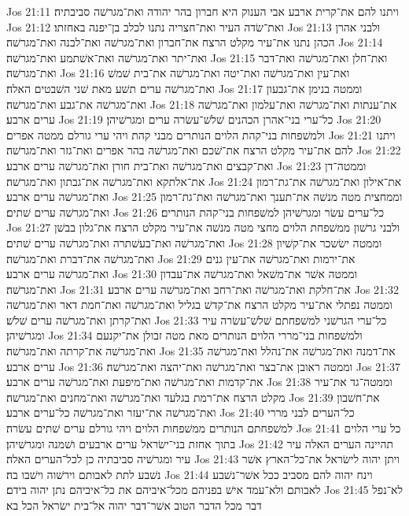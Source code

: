 Jos 21:11  ויתנו להם את־קרית ארבע אבי הענוק היא חברון בהר יהודה ואת־מגרשׁה סביבתיה׃
Jos 21:12  ואת־שׂדה העיר ואת־חצריה נתנו לכלב בן־יפנה באחזתו׃
Jos 21:13  ולבני אהרן הכהן נתנו את־עיר מקלט הרצח את־חברון ואת־מגרשׁה ואת־לבנה ואת־מגרשׁה׃
Jos 21:14  ואת־יתר ואת־מגרשׁה ואת־אשׁתמע ואת־מגרשׁה׃
Jos 21:15  ואת־חלן ואת־מגרשׁה ואת־דבר ואת־מגרשׁה׃
Jos 21:16  ואת־עין ואת־מגרשׁה ואת־יטה ואת־מגרשׁה את־בית שׁמשׁ ואת־מגרשׁה ערים תשׁע מאת שׁני השׁבטים האלה׃
Jos 21:17  וממטה בנימן את־גבעון ואת־מגרשׁה את־גבע ואת־מגרשׁה׃
Jos 21:18  את־ענתות ואת־מגרשׁה ואת־עלמון ואת־מגרשׁה ערים ארבע׃
Jos 21:19  כל־ערי בני־אהרן הכהנים שׁלשׁ־עשׂרה ערים ומגרשׁיהן׃
Jos 21:20  ולמשׁפחות בני־קהת הלוים הנותרים מבני קהת ויהי ערי גורלם ממטה אפרים׃
Jos 21:21  ויתנו להם את־עיר מקלט הרצח את־שׁכם ואת־מגרשׁה בהר אפרים ואת־גזר ואת־מגרשׁה׃
Jos 21:22  ואת־קבצים ואת־מגרשׁה ואת־בית חורן ואת־מגרשׁה ערים ארבע׃
Jos 21:23  וממטה־דן את־אלתקא ואת־מגרשׁה את־גבתון ואת־מגרשׁה׃
Jos 21:24  את־אילון ואת־מגרשׁה את־גת־רמון ואת־מגרשׁה ערים ארבע׃
Jos 21:25  וממחצית מטה מנשׁה את־תענך ואת־מגרשׁה ואת־גת־רמון ואת־מגרשׁה ערים שׁתים׃
Jos 21:26  כל־ערים עשׂר ומגרשׁיהן למשׁפחות בני־קהת הנותרים׃
Jos 21:27  ולבני גרשׁון ממשׁפחת הלוים מחצי מטה מנשׁה את־עיר מקלט הרצח את־גלון בבשׁן ואת־מגרשׁה ואת־בעשׁתרה ואת־מגרשׁה ערים שׁתים׃
Jos 21:28  וממטה ישׂשכר את־קשׁיון ואת־מגרשׁה את־דברת ואת־מגרשׁה׃
Jos 21:29  את־ירמות ואת־מגרשׁה את־עין גנים ואת־מגרשׁה ערים ארבע׃
Jos 21:30  וממטה אשׁר את־משׁאל ואת־מגרשׁה את־עבדון ואת־מגרשׁה׃
Jos 21:31  את־חלקת ואת־מגרשׁה ואת־רחב ואת־מגרשׁה ערים ארבע׃
Jos 21:32  וממטה נפתלי את־עיר מקלט הרצח את־קדשׁ בגליל ואת־מגרשׁה ואת־חמת דאר ואת־מגרשׁה ואת־קרתן ואת־מגרשׁה ערים שׁלשׁ׃
Jos 21:33  כל־ערי הגרשׁני למשׁפחתם שׁלשׁ־עשׂרה עיר ומגרשׁיהן׃
Jos 21:34  ולמשׁפחות בני־מררי הלוים הנותרים מאת מטה זבולן את־יקנעם ואת־מגרשׁה את־קרתה ואת־מגרשׁה׃
Jos 21:35  את־דמנה ואת־מגרשׁה את־נהלל ואת־מגרשׁה ערים ארבע׃
Jos 21:36  וממטה ראובן את־בצר ואת־מגרשׁה ואת־יהצה ואת־מגרשׁה׃
Jos 21:37  את־קדמות ואת־מגרשׁה ואת־מיפעת ואת־מגרשׁה ערים ארבע׃
Jos 21:38  וממטה־גד את־עיר מקלט הרצח את־רמת בגלעד ואת־מגרשׁה ואת־מחנים ואת־מגרשׁה׃
Jos 21:39  את־חשׁבון ואת־מגרשׁה את־יעזר ואת־מגרשׁה כל־ערים ארבע׃
Jos 21:40  כל־הערים לבני מררי למשׁפחתם הנותרים ממשׁפחות הלוים ויהי גורלם ערים שׁתים עשׂרה׃
Jos 21:41  כל ערי הלוים בתוך אחזת בני־ישׂראל ערים ארבעים ושׁמנה ומגרשׁיהן׃
Jos 21:42  תהיינה הערים האלה עיר עיר ומגרשׁיה סביבתיה כן לכל־הערים האלה׃
Jos 21:43  ויתן יהוה לישׂראל את־כל־הארץ אשׁר נשׁבע לתת לאבותם וירשׁוה וישׁבו בה׃
Jos 21:44  וינח יהוה להם מסביב ככל אשׁר־נשׁבע לאבותם ולא־עמד אישׁ בפניהם מכל־איביהם את כל־איביהם נתן יהוה בידם׃
Jos 21:45  לא־נפל דבר מכל הדבר הטוב אשׁר־דבר יהוה אל־בית ישׂראל הכל בא׃
